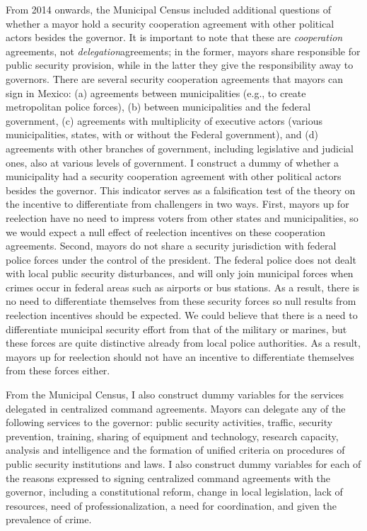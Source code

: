 \documentclass[12pt]{amsart}
\numberwithin{equation}{section}
\theoremstyle{definition}
\theoremstyle{definition}
\theoremstyle{definition}
\begin{document}
From 2014 onwards, the Municipal Census included additional questions of whether a mayor hold a security  cooperation agreement with other political actors besides the governor. It is important to note that these are \emph{cooperation} agreements, not \emph{delegation}agreements; in the former, mayors share responsible for public security provision, while in the latter they give the responsibility away to governors. There are several security cooperation agreements that mayors can sign in Mexico: (a) agreements between municipalities (e.g., to create metropolitan police forces), (b) between municipalities and the federal government, (c) agreements with multiplicity of executive actors (various municipalities, states, with or without the Federal government), and (d) agreements with other branches of government, including legislative and judicial ones, also at various levels of government. I construct a dummy of whether a municipality had a security cooperation agreement with other political actors besides the governor. This indicator serves as a falsification test of the theory on the incentive to differentiate from challengers in two ways. First, mayors up for reelection have no need to impress voters from other states and municipalities, so we would expect a null effect of reelection incentives on these cooperation agreements. Second, mayors do not share a security jurisdiction with federal police forces under the control of the president. The federal police does not dealt with local public security disturbances, and will only join municipal forces when crimes occur in federal areas such as airports or bus stations. As a result, there is no need to differentiate themselves from these security forces so null results from reelection incentives should be expected. We could believe that there is a need to differentiate municipal security effort from that of the military or marines, but these forces are quite distinctive already from local police authorities. As a result, mayors up for reelection should not have an incentive to differentiate themselves from these forces either. 

From the Municipal Census, I also construct dummy variables for the services delegated in centralized command agreements.  Mayors can delegate any of the following services to the governor: public security activities, traffic, security prevention, training, sharing of equipment and technology, research capacity, analysis and intelligence and the formation of unified criteria on procedures of public security institutions and laws. I also construct dummy variables for each of the reasons expressed to signing centralized command agreements with the governor, including a constitutional reform, change in local legislation, lack of resources, need of professionalization, a need for coordination, and given the prevalence of crime.
 
\end{document}
